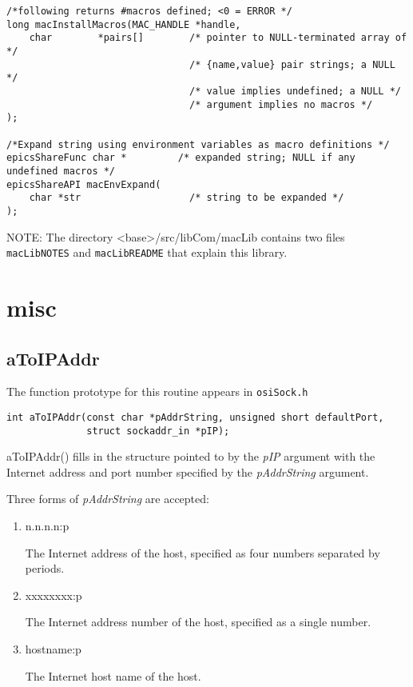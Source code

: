\begin{verbatim}
/*following returns #macros defined; <0 = ERROR */
long macInstallMacros(MAC_HANDLE *handle,
    char        *pairs[]        /* pointer to NULL-terminated array of */
                                /* {name,value} pair strings; a NULL */
                                /* value implies undefined; a NULL */
                                /* argument implies no macros */
);

/*Expand string using environment variables as macro definitions */
epicsShareFunc char *         /* expanded string; NULL if any undefined macros */
epicsShareAPI macEnvExpand(
    char *str                   /* string to be expanded */
);
\end{verbatim}

NOTE: The directory \textless{}base\textgreater{}/src/libCom/macLib contains two files \verb|macLibNOTES| and \verb|macLibREADME| that explain 
this library.

\section{misc}

\subsection{aToIPAddr}

The function prototype for this routine appears in \verb|osiSock.h|

\begin{verbatim}
int aToIPAddr(const char *pAddrString, unsigned short defaultPort,
              struct sockaddr_in *pIP);
\end{verbatim}

aToIPAddr() fills in the structure pointed to by the \emph{pIP} argument with the Internet address and port number specified by 
the \emph{pAddrString} argument. 

Three forms of \emph{pAddrString} are accepted: 

\begin{enumerate}
\item n.n.n.n:p 

The Internet address of the host, specified as four numbers separated by periods. 

\item xxxxxxxx:p 

The Internet address number of the host, specified as a single number. 

\item hostname:p 

The Internet host name of the host.

\end{enumerate}

